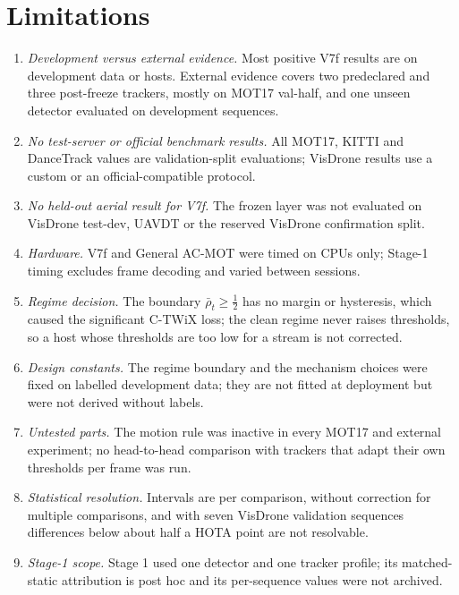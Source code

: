 \documentclass[pdflatex,sn-mathphys-num]{sn-jnl}
\begin{document}
\section{Limitations}\label{sec:limits}
\begin{enumerate}
\item \emph{Development versus external evidence.} Most positive V7f results are on development data or hosts. External evidence covers two predeclared and three post-freeze trackers, mostly on MOT17 val-half, and one unseen detector evaluated on development sequences.
\item \emph{No test-server or official benchmark results.} All MOT17, KITTI and DanceTrack values are validation-split evaluations; VisDrone results use a custom or an official-compatible protocol.
\item \emph{No held-out aerial result for V7f.} The frozen layer was not evaluated on VisDrone test-dev, UAVDT or the reserved VisDrone confirmation split.
\item \emph{Hardware.} V7f and General AC-MOT were timed on CPUs only; Stage-1 timing excludes frame decoding and varied between sessions.
\item \emph{Regime decision.} The boundary $\bar\rho_t\ge\frac12$ has no margin or hysteresis, which caused the significant C-TWiX loss; the clean regime never raises thresholds, so a host whose thresholds are too low for a stream is not corrected.
\item \emph{Design constants.} The regime boundary and the mechanism choices were fixed on labelled development data; they are not fitted at deployment but were not derived without labels.
\item \emph{Untested parts.} The motion rule was inactive in every MOT17 and external experiment; no head-to-head comparison with trackers that adapt their own thresholds per frame was run.
\item \emph{Statistical resolution.} Intervals are per comparison, without correction for multiple comparisons, and with seven VisDrone validation sequences differences below about half a HOTA point are not resolvable.
\item \emph{Stage-1 scope.} Stage 1 used one detector and one tracker profile; its matched-static attribution is post hoc and its per-sequence values were not archived.
\end{enumerate}

\end{document}

